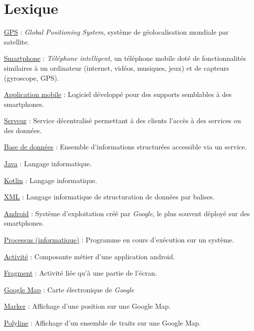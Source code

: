 \section{Lexique}

\underline{GPS} : \emph{Global Positioning System}, système de géolocalisation mondiale par satellite.

\vspace{10pt}
\underline{Smartphone} : \emph{Téléphone intelligent}, un téléphone mobile doté de fonctionnalités similaires
à un ordinateur (internet, vidéos, musiques, jeux) et de capteurs (gyroscope, GPS).

\vspace{10pt}
\underline{Application mobile} : Logiciel développé pour des supports semblables à des smartphones.

\vspace{10pt}
\underline{Serveur} : Service décentralisé permettant à des clients l'accès à des services ou des données.

\vspace{10pt}
\underline{Base de données} : Ensemble d'informations structurées accessible via un service.

\vspace{10pt}
\underline{Java} : Langage informatique.

\vspace{10pt}
\underline{Kotlin} : Langage informatique.

\vspace{10pt}
\underline{XML} : Langage informatique de structuration de données par balises.

\vspace{10pt}
\underline{Android} : Système d'exploitation créé par \emph{Google}, le plus souvent déployé sur des smartphones.

\vspace{10pt}
\underline{Processus (informatique)} : Programme en cours d'exécution sur un système.

\vspace{10pt}
\underline{Activité} : Composante métier d'une application android.

\vspace{10pt}
\underline{Fragment} : Activité liée qu'à une partie de l'écran.

\vspace{10pt}
\underline{Google Map} : Carte électronique de \emph{Google}

\vspace{10pt}
\underline{Marker} : Affichage d'une position sur une Google Map.

\vspace{10pt}
\underline{Polyline} : Affichage d'un ensemble de traits sur une Google Map.

